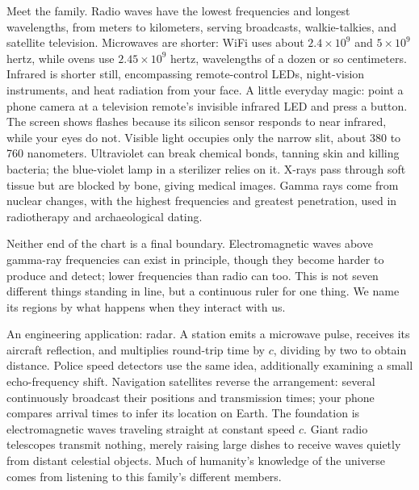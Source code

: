 \begin{mainline}
Meet the family. Radio waves have the lowest frequencies and longest wavelengths, from meters to kilometers, serving broadcasts, walkie-talkies, and satellite television. Microwaves are shorter: WiFi uses about $2.4\times10^{9}$ and $5\times10^{9}$ hertz, while ovens use $2.45\times10^{9}$ hertz, wavelengths of a dozen or so centimeters. Infrared is shorter still, encompassing remote-control LEDs, night-vision instruments, and heat radiation from your face. A little everyday magic: point a phone camera at a television remote's invisible infrared LED and press a button. The screen shows flashes because its silicon sensor responds to near infrared, while your eyes do not. Visible light occupies only the narrow slit, about 380 to 760 nanometers. Ultraviolet can break chemical bonds, tanning skin and killing bacteria; the blue-violet lamp in a sterilizer relies on it. X-rays pass through soft tissue but are blocked by bone, giving medical images. Gamma rays come from nuclear changes, with the highest frequencies and greatest penetration, used in radiotherapy and archaeological dating.

Neither end of the chart is a final boundary. Electromagnetic waves above gamma-ray frequencies can exist in principle, though they become harder to produce and detect; lower frequencies than radio can too. This is not seven different things standing in line, but a continuous ruler for one thing. We name its regions by what happens when they interact with us.

An engineering application: radar. A station emits a microwave pulse, receives its aircraft reflection, and multiplies round-trip time by $c$, dividing by two to obtain distance. Police speed detectors use the same idea, additionally examining a small echo-frequency shift. Navigation satellites reverse the arrangement: several continuously broadcast their positions and transmission times; your phone compares arrival times to infer its location on Earth. The foundation is electromagnetic waves traveling straight at constant speed $c$. Giant radio telescopes transmit nothing, merely raising large dishes to receive waves quietly from distant celestial objects. Much of humanity's knowledge of the universe comes from listening to this family's different members.
\end{mainline}

